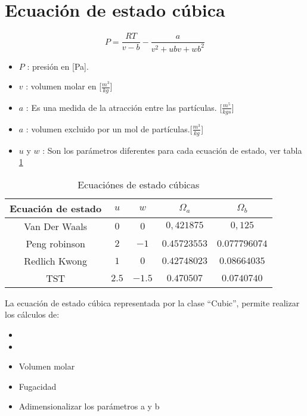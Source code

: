 \section{Ecuación de estado cúbica}
\begin{equation}
P = \frac{R T}{v-b} - \frac{a}{v^2 +u b v + w b^2 }
\end{equation}
\begin{itemize}\itemsep0ex
\item{$P$} : presión en [Pa].\\
\item{$v$} : volumen molar en [$\frac{m^3}{kg}$]\\
\item{$a$} : Es una medida de la atracción entre las partículas. [$\frac{m^5}{kg s}$]\\
\item{$a$} : volumen excluido por un mol de partículas.[$\frac{m^3}{kg}$]\\
\item{$u $ y $w $} : Son los parámetros diferentes para cada ecuación de estado, ver tabla \ref{tab:cubics}\\
\end{itemize}

	\begin{table}
	
	\begin{tabular}{|c |c | c | c | c |}
		\hline
		Ecuación de estado  & $u$ & $w$ & $\Omega_a$&$\Omega_b$\\
		\hline
		Van Der Waals  & $0$ & $0$ & $0,421875$ & $0,125$\\
		\hline
		Peng robinson  & $2$ & $-1$ & $0.45723553$ & $0.077796074$\\
		\hline
		Redlich Kwong  & $1$ & $0$ & $0.42748023$ & $0.08664035$\\
		\hline
		TST  & $2.5$ & $-1.5$ &$ 0.470507$ & $0.0740740$\\
		\hline
	\end{tabular}
	\caption{Ecuaciónes de estado cúbicas}\label{tab:cubics}
	\end{table}


La ecuación de estado cúbica representada por la clase ``Cubic'', permite realizar los cálculos de: 
\begin{itemize}
\itemsep0ex
	\item{} 
	\item{}
	\item{Volumen molar}
	\item{Fugacidad}
	\item{Adimensionalizar los parámetros a y b}
\end{itemize}

